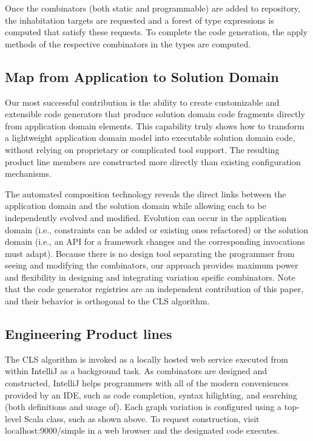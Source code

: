 Once the combinators (both static and programmable) are added to repository, the inhabitation targets are requested
and a forest of type expressions is computed that satisfy these requests. To complete the code generation, the apply
methods of the respective combinators in the types are computed.


 \subsection{Map from Application to Solution Domain}

 Our most successful contribution is the ability to create customizable and extensible code generators that produce
 solution domain code fragments directly from application domain elements.
 This capability truly shows how to transform a lightweight application domain model into executable solution domain
 code, without relying on proprietary or complicated tool support. The resulting product line members are constructed
 more directly than existing configuration mechanisms.

 The automated composition technology reveals the direct links between the application domain and the solution
 domain while allowing each to be independently evolved and modified. Evolution can occur in the application domain
 (i.e., constraints can be added or existing ones refactored) or the solution domain (i.e., an API for a framework
 changes and the corresponding invocations must adapt). Because there is no design tool separating the programmer
 from seeing and modifying the combinators, our approach provides maximum power and flexibility in designing and
 integrating variation speific combinators. Note that the code generator registries are an independent contribution
 of this paper, and their behavior is orthogonal to the CLS algorithm.

 \subsection{Engineering Product lines}

 The CLS algorithm is invoked as a locally hosted web service executed from within IntelliJ as a background task.
 As combinators are designed and constructed, IntelliJ helps programmers with all of the modern conveniences
 provided by an IDE, such as code completion, syntax hilighting, and searching (both definitions and usage of).
 Each graph variation is configured using a top-level Scala class, such as shown above.
 To request construction, visit localhost:9000/simple in a web browser and the designated code executes.

